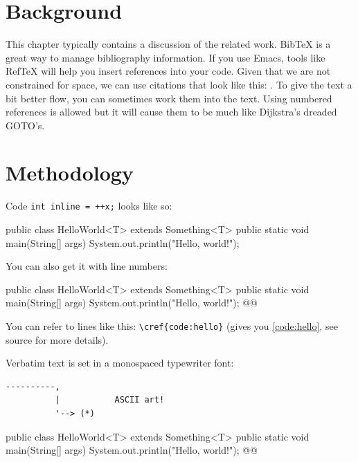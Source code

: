 \documentclass[11pt,titlepage,openright]{book}
\makeatletter
\renewenvironment{listing*}[1][]{%
  \begin{listing}[#1]%
    }{%
  \end{listing}}
\renewcommand{\c}[1]{\lstinline[style=std]@#1@}
\makeatother
\begin{document}
\chapter{Background}
\label{cha:background}

This chapter typically contains a discussion of the related work.
BibTeX is a great way to manage bibliography information. If you
use Emacs, tools like RefTeX will help you insert references into
your code. Given that we are not constrained for space, we can use
citations that look like this: \citep{Acm_Curriculum_2013,
  CWE_193}. To give the text a bit better flow, you can sometimes
work them into the text. Using numbered references is allowed but
it will cause them to be much like Dijkstra's
\citeyearpar{Dijkstra_1968} dreaded GOTO's.

\chapter{Methodology}
\lipsum[1] Code \c{int inline = ++x;} looks like so:

\begin{Code}
public class HelloWorld<T> extends Something<T> {
  public static void main(String[] args) {
    System.out.println("Hello, world!");
  }
}
\end{Code}

You can also get it with line numbers:

\begin{Code_Numbered}
public class HelloWorld<T> extends Something<T> {
  public static void main(String[] args) {
    System.out.println("Hello, world!"); @\label{code:hello}@
  }
}
\end{Code_Numbered}


You can refer to lines like this: \verb+\cref{code:hello}+ (gives you \cref{code:hello}, see source for more details).

Verbatim text is set in a monospaced typewriter font:

\begin{verbatim}
----------,
          |           ASCII art!
          '--> (*)
\end{verbatim}

\lipsum[2-4]

\begin{table}[!h]
  \caption{bar}
  \label{tab:bar}
\end{table}

\begin{listing*}[t]
\begin{Code_Numbered}
public class HelloWorld<T> extends Something<T> {
  public static void main(String[] args) {
    System.out.println("Hello, world!"); @\label{code:hello:2}@
  }
}
\end{Code_Numbered}
\caption{If you like, you can have code listings inside a \c{listing} float.}
\label{lst:foo}
\end{listing*}
\end{document}
